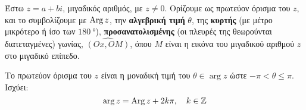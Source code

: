 \begin{mybox1}
  \begin{dfn}
    Έστω $ z=a+bi $, μιγαδικός αριθμός, με $ z \neq 0 $. 
    Ορίζουμε ως \textcolor{Col1}{πρωτεύον όρισμα} του $ z 
    $, και το συμβολίζουμε με $ \operatorname{Arg} z $, την \textbf{αλγεβρική τιμή} $\theta$, 
    της \textbf{κυρτής} (με μέτρο μικρότερο ή ίσο των $ \SI{180}{\degree} $), 
    \textbf{προσανατολισμένης} (οι πλευρές της θεωρούνται διατεταγμένες) γωνίας, 
    $ \widehat{(Ox,OM)} $, όπου $M$ είναι η εικόνα του 
    μιγαδικού αριθμού $z$ στο μιγαδικό επίπεδο.
  \end{dfn}
\end{mybox1}

\begin{rem}
  Το πρωτεύον όρισμα του $z$ είναι η μοναδική τιμή του 
  $\theta\in \arg z$ ώστε $ - \pi < \theta \leq \pi$. 
  Ισχύει:
  \[
    \arg z=\operatorname{Arg} z+2k\pi, \quad k\in\mathbb{Z}
  \]
\end{rem}


